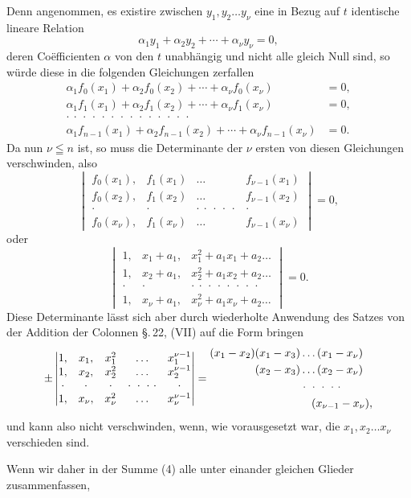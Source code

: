 Denn angenommen, es existire zwischen $y_1, y_2 \ldots y_\nu$ eine in
Bezug auf $t$ identische lineare Relation
\[
\alpha_1 y_1 + \alpha_2 y_2 + \cdots + \alpha_\nu y_\nu = 0,
\]
deren Coëfficienten $\alpha$ von den $t$ unabhängig und nicht alle gleich
Null sind, so würde diese in die folgenden Gleichungen zerfallen
\[
\begin{aligned}
\alpha_1 f_0(x_1) + \alpha_2 f_0(x_2) + \cdots + \alpha_\nu f_0(x_\nu) &= 0, \\
\alpha_1 f_1(x_1) + \alpha_2 f_1(x_2) + \cdots + \alpha_\nu f_1(x_\nu) &= 0, \\
\cdot\ \cdot\ \cdot\ \cdot\ \cdot\ \cdot\ \cdot\ \cdot\ \cdot\ \cdot\ \cdot\ \cdot\ \cdot\ \cdot & \\
\alpha_1 f_{n-1}(x_1) + \alpha_2 f_{n-1}(x_2) + \cdots + \alpha_\nu f_{n-1}(x_\nu) &= 0.
\end{aligned}
\]
Da nun $\nu \leqq n$ ist,
so muss die Determinante der $\nu$ ersten
von diesen Gleichungen verschwinden, also
\[
\begin{vmatrix}
f_0(x_1), & f_1(x_1) & \ldots & f_{\nu-1}(x_1) \\
f_0(x_2), & f_1(x_2) & \ldots & f_{\nu-1}(x_2) \\
\cdot & \cdot & \cdot\ \cdot\ \cdot\ \cdot\ \cdot & \cdot \\
f_0(x_\nu), & f_1(x_\nu) & \ldots & f_{\nu-1}(x_\nu)
\end{vmatrix}
= 0,
\]
oder
\[
\begin{vmatrix}
1, & x_1 + a_1, & x_1^2 + a_1 x_1 + a_2 \ldots \\
1, & x_2 + a_1, & x_2^2 + a_1 x_2 + a_2 \ldots \\
\cdot & \cdot & \cdot\ \cdot\ \cdot\ \cdot\ \cdot\ \cdot\ \cdot\ \cdot \\
1, & x_\nu + a_1, & x_\nu^2 + a_1 x_\nu + a_2 \ldots
\end{vmatrix}
= 0.
\]
Diese Determinante lässt sich aber durch wiederholte Anwendung
des Satzes von der Addition der Colonnen \S.\,22, (VII)
auf die Form bringen
\[
\pm
\begin{vmatrix}
1, & x_1, & x_1^2 & \ldots & x_1^{\nu-1} \\
1, & x_2, & x_2^2 & \ldots & x_2^{\nu-1} \\
\cdot & \cdot & \cdot & \cdot\ \cdot\ \cdot\ \cdot & \cdot \\
1, & x_\nu, & x_\nu^2 & \ldots & x_\nu^{\nu-1}
\end{vmatrix}
=
\begin{aligned}
&(x_1 - x_2)(x_1 - x_3) \ldots (x_1 - x_\nu) \\
&\hphantom{(x_1 - x_2)}(x_2 - x_3) \ldots (x_2 - x_\nu) \\
&\hphantom{(x_1 - x_2)(x_2 - x_3)}\cdot\ \cdot\ \cdot\ \cdot\ \cdot \\
&\hphantom{(x_1 - x_2)(x_2 - x_3)\cdot\cdot}(x_{\nu-1} - x_\nu),
\end{aligned}
\]
und kann also nicht verschwinden, wenn, wie vorausgesetzt war,
die $x_1, x_2 \ldots x_\nu$ verschieden sind.

Wenn wir daher in der Summe (4) alle unter einander gleichen
Glieder zusammenfassen, 
